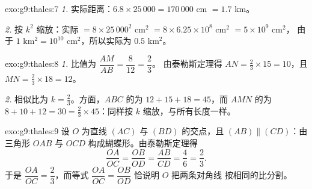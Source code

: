 \begin{solution}{exo:g9:thales:7}
\emph{1.} 实际距离：$6.8 \times 25\,000 = 170\,000$ cm $=
1.7$ km。

\emph{2.} 按 $k^2$ 缩放：实际 $= 8 \times 25\,000^2$
cm$^2$ $= 8 \times 6.25 \times 10^8$ cm$^2$ $= 5 \times 10^9$ cm$^2$，
由于 $1$ km$^2 = 10^{10}$ cm$^2$，所以实际为 $0.5$ km$^2$。
\end{solution}

\begin{solution}{exo:g9:thales:8}
\emph{1.} 比值为 $\dfrac{AM}{AB} = \dfrac{8}{12} = \dfrac23$。
由泰勒斯定理得 $AN = \frac23 \times 15 = 10$，且 $MN = \frac23 \times 18 = 12$。

\emph{2.} 相似比为 $k = \frac23$。方面，$ABC$ 的为
$12 + 15 + 18 = 45$，而 $AMN$ 的为 $8 + 10 + 12 = 30 = \frac23 \times
45$：同样按 $k$ 缩放，与所有长度一样。
\end{solution}

\begin{solution}{exo:g9:thales:9}
设 $O$ 为直线 $(AC)$ 与 $(BD)$ 的交点，且
$(AB) \parallel (CD)$：由三角形 $OAB$
与 $OCD$ 构成蝴蝶形。由泰勒斯定理得
\[
\frac{OA}{OC} = \frac{OB}{OD} = \frac{AB}{CD} = \frac46 = \frac23 .
\]
于是 $\dfrac{OA}{OC} = \dfrac23$，而等式
$\dfrac{OA}{OC} = \dfrac{OB}{OD}$ 恰说明 $O$ 把两条对角线
按相同的比分割。
\end{solution}

